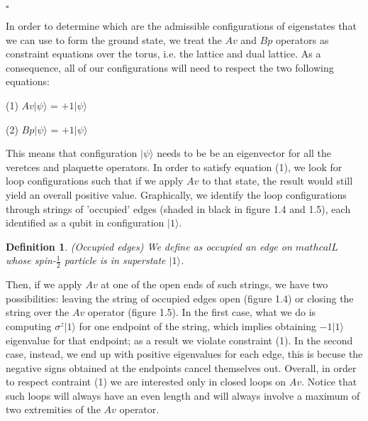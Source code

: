 \documentclass{Configuration_Files/PoliMi3i_thesis}
\newtheorem{definition}{Definition}[chapter]
\begin{document}
\hfill $\square$


In order to determine which are the admissible configurations of eigenstates that we can use to form the ground state, we treat the $Av$ and $Bp$ operators as constraint equations over the torus, i.e. the lattice and dual lattice.
As a consequence, all of our configurations will need to respect the two following equations:

\begin{center}
	(1)	$Av|\psi\rangle$ = $+1|\psi\rangle$
\end{center}

\begin{center}
	(2)	$Bp|\psi\rangle$ = $+1|\psi\rangle$
\end{center}

This means that configuration $|\psi\rangle$ needs to be be an eigenvector for all the veretces and plaquette operators. \newline
In order to satisfy equation (1), we look for loop configurations such that if we apply $Av$ to that state, the result would still yield an overall positive value.\newline
Graphically, we identify the loop configurations through strings of 'occupied' edges (shaded in black in figure 1.4 and 1.5), each identified as a qubit in configuration $|1\rangle$.

\begin{definition}(Occupied edges)
	We define as occupied an edge on $mathcal{L}$ whose spin-$\frac{1}{2}$ particle is in superstate $|1\rangle$.
\end{definition}

Then, if we apply $Av$ at one of the open ends of such strings, we have two possibilities: leaving the string of occupied edges open (figure 1.4) or closing the string over the $Av$ operator (figure 1.5).
In the first case, what we do is computing $\sigma^{z} |1\rangle$ for one endpoint of the string, which implies obtaining $-1|1\rangle$ eigenvalue for that endpoint; as a result we violate constraint (1). In the second case, instead, we end up with positive eigenvalues for each edge, this is becuse the negative signs obtained at the endpoints cancel themselves out. Overall, in order to respect contraint (1) we are interested only in closed loops on $Av$. Notice that such loops will always have an even length and will always involve a maximum of two extremities of the $Av$ operator.\textit{\cite{Her20}}
\end{document}
